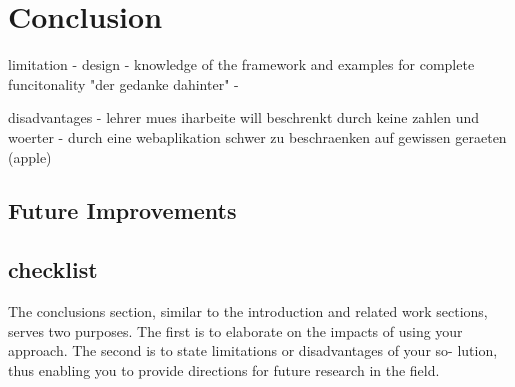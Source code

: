 
\chapter{Conclusion}
\label{chap:conclusion}

limitation
- design
- knowledge of the framework and examples for complete funcitonality "der gedanke dahinter"
-

disadvantages
- lehrer mues iharbeite will beschrenkt durch keine zahlen und woerter
- durch eine webaplikation schwer zu beschraenken auf gewissen geraeten (apple)


\section{Future Improvements}

\section{checklist}
The conclusions section, similar to the introduction and
related work sections, serves two purposes. The first is
to elaborate on the impacts of using your approach. The
second is to state limitations or disadvantages of your so-
lution, thus enabling you to provide directions for future
research in the field.
